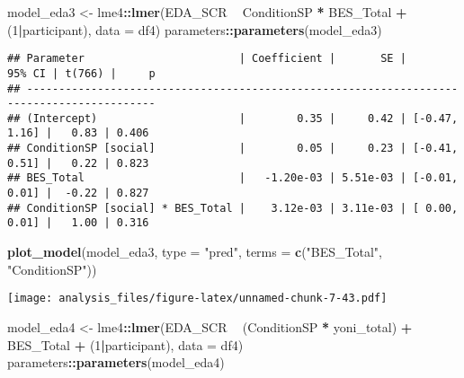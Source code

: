\documentclass[
]{article}
\newenvironment{Shaded}{\begin{snugshade}}{\end{snugshade}}
\newcommand{\DataTypeTok}[1]{\textcolor[rgb]{0.13,0.29,0.53}{#1}}
\newcommand{\DecValTok}[1]{\textcolor[rgb]{0.00,0.00,0.81}{#1}}
\newcommand{\KeywordTok}[1]{\textcolor[rgb]{0.13,0.29,0.53}{\textbf{#1}}}
\newcommand{\NormalTok}[1]{#1}
\newcommand{\OperatorTok}[1]{\textcolor[rgb]{0.81,0.36,0.00}{\textbf{#1}}}
\newcommand{\StringTok}[1]{\textcolor[rgb]{0.31,0.60,0.02}{#1}}
\begin{document}
\begin{Shaded}
\begin{Highlighting}[]
\NormalTok{model_eda3 <-}\StringTok{ }\NormalTok{lme4}\OperatorTok{::}\KeywordTok{lmer}\NormalTok{(EDA_SCR }\OperatorTok{~}\StringTok{ }\NormalTok{ConditionSP }\OperatorTok{*}\StringTok{ }\NormalTok{BES_Total }\OperatorTok{+}\StringTok{ }\NormalTok{(}\DecValTok{1}\OperatorTok{|}\NormalTok{participant), }\DataTypeTok{data =}\NormalTok{ df4)}
\NormalTok{parameters}\OperatorTok{::}\KeywordTok{parameters}\NormalTok{(model_eda3)}
\end{Highlighting}
\end{Shaded}

\begin{verbatim}
## Parameter                        | Coefficient |       SE |        95% CI | t(766) |     p
## ------------------------------------------------------------------------------------------
## (Intercept)                      |        0.35 |     0.42 | [-0.47, 1.16] |   0.83 | 0.406
## ConditionSP [social]             |        0.05 |     0.23 | [-0.41, 0.51] |   0.22 | 0.823
## BES_Total                        |   -1.20e-03 | 5.51e-03 | [-0.01, 0.01] |  -0.22 | 0.827
## ConditionSP [social] * BES_Total |    3.12e-03 | 3.11e-03 | [ 0.00, 0.01] |   1.00 | 0.316
\end{verbatim}

\begin{Shaded}
\begin{Highlighting}[]
\KeywordTok{plot_model}\NormalTok{(model_eda3, }\DataTypeTok{type =} \StringTok{"pred"}\NormalTok{, }\DataTypeTok{terms =} \KeywordTok{c}\NormalTok{(}\StringTok{"BES_Total"}\NormalTok{, }\StringTok{"ConditionSP"}\NormalTok{))}
\end{Highlighting}
\end{Shaded}

\texttt{[image: analysis\_files/figure-latex/unnamed-chunk-7-43.pdf]}

\begin{Shaded}
\begin{Highlighting}[]
\NormalTok{model_eda4 <-}\StringTok{ }\NormalTok{lme4}\OperatorTok{::}\KeywordTok{lmer}\NormalTok{(EDA_SCR }\OperatorTok{~}\StringTok{ }\NormalTok{(ConditionSP }\OperatorTok{*}\StringTok{ }\NormalTok{yoni_total) }\OperatorTok{+}\StringTok{ }\NormalTok{BES_Total }\OperatorTok{+}\StringTok{ }\NormalTok{(}\DecValTok{1}\OperatorTok{|}\NormalTok{participant), }\DataTypeTok{data =}\NormalTok{ df4)}
\NormalTok{parameters}\OperatorTok{::}\KeywordTok{parameters}\NormalTok{(model_eda4)}
\end{Highlighting}
\end{Shaded}
\end{document}
